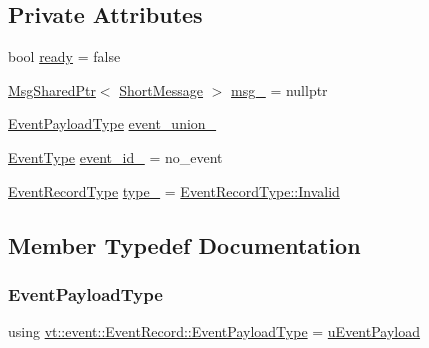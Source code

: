 \subsection*{Private Attributes}
\begin{DoxyCompactItemize}
\item 
bool \hyperlink{structvt_1_1event_1_1_event_record_a5bbd2f1c9a7335ef4be44db273215f9a}{ready} = false
\item 
\hyperlink{namespacevt_ab2b3d506ec8e8d1540aede826d84a239}{Msg\+Shared\+Ptr}$<$ \hyperlink{namespacevt_a1125ac1da6c0bbf141e0ea0739d7602d}{Short\+Message} $>$ \hyperlink{structvt_1_1event_1_1_event_record_a5cffc5288d077e2e68c316134e486d32}{msg\+\_\+} = nullptr
\item 
\hyperlink{structvt_1_1event_1_1_event_record_aecf5b6b386947ef5f0d5bf410d0b2944}{Event\+Payload\+Type} \hyperlink{structvt_1_1event_1_1_event_record_a2da4116e2d72fb3d7cd177a2bb91cc82}{event\+\_\+union\+\_\+}
\item 
\hyperlink{namespacevt_a009267401def7ae8bf201892222d060f}{Event\+Type} \hyperlink{structvt_1_1event_1_1_event_record_ac0da30d15e6a7ad968a698a7e82c1a4e}{event\+\_\+id\+\_\+} = no\+\_\+event
\item 
\hyperlink{namespacevt_1_1event_a1ea9fec44d101bf40b8fd786d44ebed9}{Event\+Record\+Type} \hyperlink{structvt_1_1event_1_1_event_record_a2b2684a996dd14b092ba3fef2fcce6b4}{type\+\_\+} = \hyperlink{namespacevt_1_1event_a1ea9fec44d101bf40b8fd786d44ebed9a4bbb8f967da6d1a610596d7257179c2b}{Event\+Record\+Type\+::\+Invalid}
\end{DoxyCompactItemize}


\subsection{Member Typedef Documentation}
\mbox{\label{structvt_1_1event_1_1_event_record_aecf5b6b386947ef5f0d5bf410d0b2944}} 
\subsubsection{\texorpdfstring{Event\+Payload\+Type}{EventPayloadType}}
{\footnotesize\ttfamily using \hyperlink{structvt_1_1event_1_1_event_record_aecf5b6b386947ef5f0d5bf410d0b2944}{vt\+::event\+::\+Event\+Record\+::\+Event\+Payload\+Type} =  \hyperlink{unionvt_1_1event_1_1u_event_payload}{u\+Event\+Payload}}

